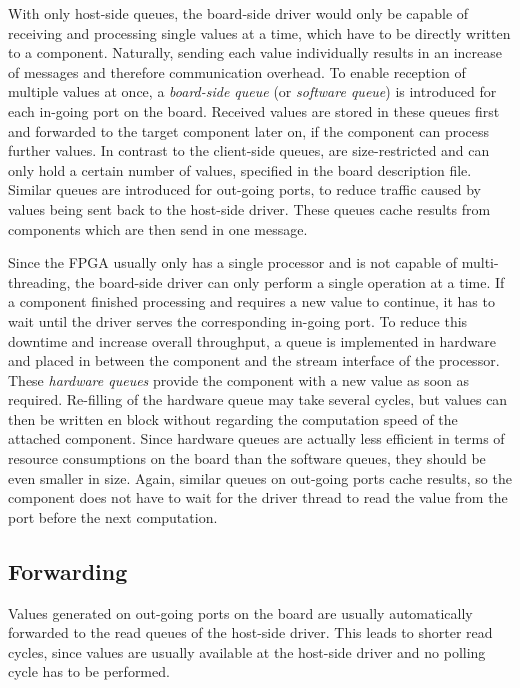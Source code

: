 \documentclass{report}
\begin{document}
With only host-side queues, the board-side driver would only be capable of receiving and processing single values at a time, which have to be directly written to a component. Naturally, sending each value individually results in an increase of messages and therefore communication overhead. To enable reception of multiple values at once, a \textit{board-side queue} (or \textit{software queue}) is introduced for each in-going port on the board. Received values are stored in these queues first and forwarded to the target component later on, if the component can process further values. In contrast to the client-side queues, are size-restricted and can only hold a certain number of values, specified in the board description file.
Similar queues are introduced for out-going ports, to reduce traffic caused by values being sent back to the host-side driver. These queues cache results from components which are then send in one message.

Since the FPGA usually only has a single processor and is not capable of multi-threading, the board-side driver can only perform a single operation at a time. If a component finished processing and requires a new value to continue, it has to wait until the driver serves the corresponding in-going port. To reduce this downtime and increase overall throughput, a queue is implemented in hardware and placed in between the component and the stream interface of the processor. These \textit{hardware queues} provide the component with a new value as soon as required. Re-filling of the hardware queue may take several cycles, but values can then be written en block without regarding the computation speed of the attached component. Since hardware queues are actually less efficient in terms of resource consumptions on the board than the software queues, they should be even smaller in size. Again, similar queues on out-going ports cache results, so the component does not have to wait for the driver thread to read the value from the port before the next computation.

\subsection{Forwarding}
\label{sec:arch:fwd}
Values generated on out-going ports on the board are usually automatically forwarded to the read queues of the host-side driver. This leads to shorter read cycles, since values are usually available at the host-side driver and no polling cycle has to be performed. 
\end{document}
